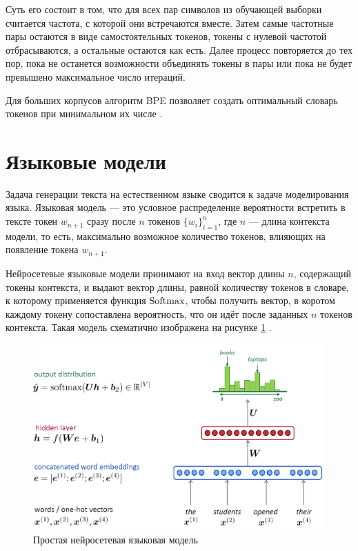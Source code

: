 Суть его состоит в том, что для всех пар символов из обучающей выборки считается частота, с которой они встречаются вместе. Затем самые частотные пары остаются в виде самостоятельных токенов, токены с нулевой частотой отбрасываются, а остальные остаются как есть. Далее процесс повторяется до тех пор, пока не останется возможности объединять токены в пары или пока не будет превышено максимальное число итераций.

Для больших корпусов алгоритм BPE позволяет создать оптимальный словарь токенов при минимальном их числе \cite{art:bpe}.

\section{Языковые модели}

Задача генерации текста на естественном языке сводится к задаче моделирования языка. Языковая модель --- это условное распределение вероятности встретить в тексте токен $w_{n+1}$ сразу после $n$ токенов $\{w_i\}_{i=1}^n$, где $n$ --- длина контекста модели, то есть, максимально возможное количество токенов, влияющих на появление токена $w_{n+1}$.

Нейросетевые языковые модели принимают на вход вектор длины $n$, содержащий токены контекста, и выдают вектор длины, равной количеству токенов в словаре, к которому применяется функция $\operatorname{Softmax}$, чтобы получить вектор, в коротом каждому токену сопоставлена вероятность, что он идёт после заданных $n$ токенов контекста. Такая модель схематично изображена на рисунке \ref*{fig:lang_model} \cite{art:lang_models}.

\begin{figure}
    \centering
    \includegraphics[width=\textwidth]{../inc/images/language_model.png}
    \caption{Простая нейросетевая языковая модель}
    \label{fig:lang_model}
\end{figure}

